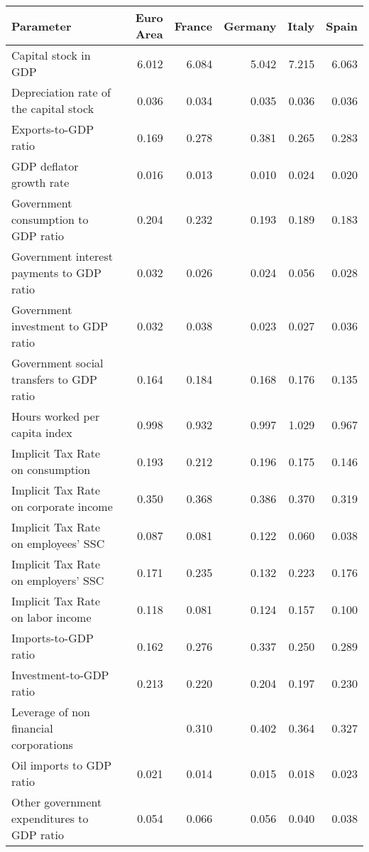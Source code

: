 \begin{table}[ht]
\centering
\begin{tabular}{lrrrrr}
  \hline
Parameter & Euro Area & France & Germany & Italy & Spain \\ 
  \hline
Capital stock in GDP & 6.012 & 6.084 & 5.042 & 7.215 & 6.063 \\ 
  Depreciation rate 
 of the capital stock & 0.036 & 0.034 & 0.035 & 0.036 & 0.036 \\ 
  Exports-to-GDP ratio & 0.169 & 0.278 & 0.381 & 0.265 & 0.283 \\ 
  GDP deflator 
 growth rate & 0.016 & 0.013 & 0.010 & 0.024 & 0.020 \\ 
  Government consumption 
 to GDP ratio & 0.204 & 0.232 & 0.193 & 0.189 & 0.183 \\ 
  Government interest 
 payments to GDP ratio & 0.032 & 0.026 & 0.024 & 0.056 & 0.028 \\ 
  Government investment 
 to GDP ratio & 0.032 & 0.038 & 0.023 & 0.027 & 0.036 \\ 
  Government social 
 transfers to GDP ratio & 0.164 & 0.184 & 0.168 & 0.176 & 0.135 \\ 
  Hours worked per 
 capita index & 0.998 & 0.932 & 0.997 & 1.029 & 0.967 \\ 
  Implicit Tax Rate 
 on consumption & 0.193 & 0.212 & 0.196 & 0.175 & 0.146 \\ 
  Implicit Tax Rate 
 on corporate income & 0.350 & 0.368 & 0.386 & 0.370 & 0.319 \\ 
  Implicit Tax Rate 
 on employees' SSC & 0.087 & 0.081 & 0.122 & 0.060 & 0.038 \\ 
  Implicit Tax Rate 
 on employers' SSC & 0.171 & 0.235 & 0.132 & 0.223 & 0.176 \\ 
  Implicit Tax Rate 
 on labor income  & 0.118 & 0.081 & 0.124 & 0.157 & 0.100 \\ 
  Imports-to-GDP ratio & 0.162 & 0.276 & 0.337 & 0.250 & 0.289 \\ 
  Investment-to-GDP ratio & 0.213 & 0.220 & 0.204 & 0.197 & 0.230 \\ 
  Leverage of non 
 financial corporations &  & 0.310 & 0.402 & 0.364 & 0.327 \\ 
  Oil imports to GDP ratio & 0.021 & 0.014 & 0.015 & 0.018 & 0.023 \\ 
  Other government 
 expenditures to GDP ratio & 0.054 & 0.066 & 0.056 & 0.040 & 0.038 \\ 

\end{tabular}
\end{table}
